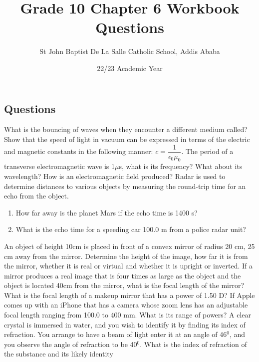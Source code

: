 \documentclass[12pt,addpoints]{exam}
\author{St John Baptist De La Salle Catholic School, Addis Ababa}
\date{22/23 Academic Year}
\begin{document}
	\title{Grade 10 Chapter 6 Workbook Questions}
	\maketitle
	
	\begin{center}
		\subsection*{Questions}
	\end{center}
	\begin{questions}
		\question What is the bouncing of waves when they encounter a different medium called? 
		\question Show that the speed of light in vacuum can be expressed in terms of the electric and magnetic constants in the following manner: $c=\dfrac{1}{\epsilon_0\mu_0}$.
		\question The period of a transverse electromagnetic wave is 1$\mu$s, what is its frequency? What about its wavelength?
		\question How is an electromagnetic field produced?
		\question Radar is used to determine distances to various objects by measuring the round-trip time for an echo from the object.
		\begin{enumerate}[label=(\roman*)]
			\item How far away is the planet Mars if the echo time is 1400 s?
			\item What is the echo time for a speeding car 100.0 m from a police radar unit?
		\end{enumerate}
		\question An object of height 10cm is placed in front of a convex mirror of radius 20 cm,  25 cm away from the mirror. Determine the height of the image, how far it is from the mirror, whether it is real or virtual and whether it is upright or inverted.
		\question If a mirror produces a real image that is four times as large as the object and the object is located 40cm from the mirror, what is the focal length of the mirror?
		\question What is the focal length of a makeup mirror that has a power of 1.50 D?
		\question If Apple comes up with an iPhone that has a camera whose zoom lens has an adjustable focal length ranging from 100.0 to 400 mm. What is its range of powers?
		\question A clear crystal is immersed in water, and you wish to identify it by finding its index of refraction. You arrange to have a beam of light enter it at an angle of 46$^0$, and you observe the angle of refraction to be 40$^0$. What is the index of refraction of the substance and its likely identity
	\end{questions}		
\end{document}
